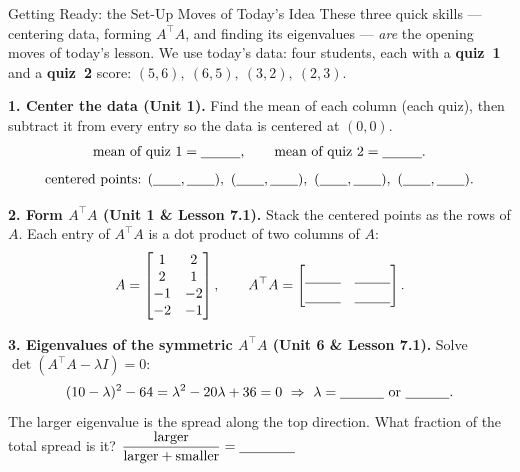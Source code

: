 \documentclass[10pt]{article}
\newcommand{\T}{^{\top}}
\begin{document}
\namedateperiod

\vspace{0.12in}

\begin{notesbox}{Getting Ready: the Set-Up Moves of Today's Idea}
\small These three quick skills --- centering data, forming $A\T A$, and finding its eigenvalues --- \emph{are}
the opening moves of today's lesson. We use today's data: four students, each with a \textbf{quiz~1} and a
\textbf{quiz~2} score: $(5,6),\ (6,5),\ (3,2),\ (2,3)$.

\vspace{4pt}
\textbf{1. Center the data (Unit 1).} Find the mean of each column (each quiz), then subtract it from every
entry so the data is centered at $(0,0)$.
\[
  \text{mean of quiz 1}=\blank{1.0cm},\qquad \text{mean of quiz 2}=\blank{1.0cm}.
\]
\[
  \text{centered points: } (\blank{0.7cm},\blank{0.7cm}),\ (\blank{0.7cm},\blank{0.7cm}),\
  (\blank{0.7cm},\blank{0.7cm}),\ (\blank{0.7cm},\blank{0.7cm}).
\]

\textbf{2. Form $A\T A$ (Unit 1 \& Lesson 7.1).} Stack the centered points as the rows of $A$. Each entry of
$A\T A$ is a dot product of two columns of $A$:
\[
  A=\begin{bmatrix} 1 & 2\\ 2 & 1\\ -1 & -2\\ -2 & -1 \end{bmatrix},\qquad
  A\T A=\begin{bmatrix}\rule{0pt}{1.1em}\blank{0.9cm} & \blank{0.9cm}\\[2pt]\blank{0.9cm} & \blank{0.9cm}\end{bmatrix}.
\]

\textbf{3. Eigenvalues of the symmetric $A\T A$ (Unit 6 \& Lesson 7.1).} Solve $\det(A\T A-\lambda I)=0$:
\[
  (10-\lambda)^2-64=\lambda^2-20\lambda+36=0 \ \Rightarrow\ \lambda=\blank{1.1cm}\ \text{or}\ \blank{1.1cm}.
\]
The larger eigenvalue is the spread along the top direction. What fraction of the total spread is it?
$\dfrac{\text{larger}}{\text{larger}+\text{smaller}}=\blank{1.4cm}$
\end{notesbox}
\end{document}
